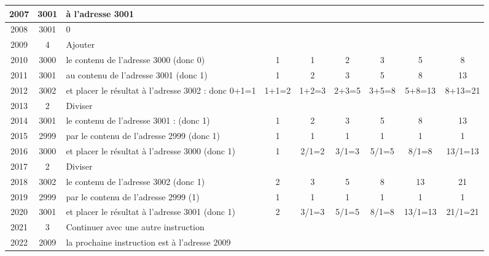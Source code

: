 \begin{graybox}
{\begin{tabular}{|c|c|l|c|c|c|c|c|c|}
        \hline
        2007 & 3001 & à l'adresse 3001                                                & & & & & & \\
        \hline
        2008 & 3001 & 0                                                               & & & & & & \\
        \hline
        2009 & 4    & Ajouter                                                         & & & & & & \\
        \hline
        2010 & 3000 & le contenu de l'adresse 3000 (donc 0)                          & 1       & 1       & 2       & 3       & 5       & 8        \\
        \hline
        2011 & 3001 & au contenu de l'adresse 3001 (donc 1)                          & 1       & 2       & 3       & 5       & 8       & 13       \\
        \hline
        2012 & 3002 & et placer le résultat à l'adresse 3002 : donc 0+1=1            & 1+1=2   & 1+2=3   & 2+3=5   & 3+5=8   & 5+8=13  & 8+13=21  \\
        \hline
        2013 & 2    & Diviser                                                         & & & & & & \\
        \hline
        2014 & 3001 & le contenu de l'adresse 3001 : (donc 1)                        & 1       & 2       & 3       & 5       & 8       & 13       \\
        \hline
        2015 & 2999 & par le contenu de l'adresse 2999 (donc 1)                      & 1       & 1       & 1       & 1       & 1       & 1        \\
        \hline
        2016 & 3000 & et placer le résultat à l'adresse 3000 (donc 1)                & 1       & 2/1=2   & 3/1=3   & 5/1=5   & 8/1=8   & 13/1=13  \\
        \hline
        2017 & 2    & Diviser                                                         & & & & & & \\
        \hline
        2018 & 3002 & le contenu de l'adresse 3002 (donc 1)                          & 2       & 3       & 5       & 8       & 13      & 21       \\
        \hline
        2019 & 2999 & par le contenu de l'adresse 2999 (1)                           & 1       & 1       & 1       & 1       & 1       & 1        \\
        \hline
        2020 & 3001 & et placer le résultat à l'adresse 3001 (donc 1)                & 2       & 3/1=3   & 5/1=5   & 8/1=8   & 13/1=13 & 21/1=21  \\
        \hline
        2021 & 3    & Continuer avec une autre instruction                            & & & & & & \\
        \hline
        2022 & 2009 & la prochaine instruction est à l'adresse 2009                  & & & & & & \\
        \hline
    \end{tabular}%
    }


\end{graybox}
